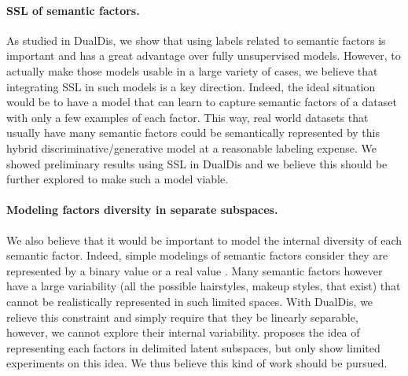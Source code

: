 \paragraph{\acf{SSL} of semantic factors.}
As studied in DualDis, we show that using labels related to semantic factors is important and has a great advantage over fully unsupervised models. However, to actually make those models usable in a large variety of cases, we believe that integrating \ac{SSL} in such models is a key direction. Indeed, the ideal situation would be to have a model that can learn to capture semantic factors of a dataset with only a few examples of each factor. This way, real world datasets that usually have many semantic factors could be semantically represented by this hybrid discriminative/generative model at a reasonable labeling expense. We showed preliminary results using \ac{SSL} in DualDis and we believe this should be further explored to make such a model viable.

\paragraph{Modeling factors diversity in separate subspaces.}
We also believe that it would be important to model the internal diversity of each semantic factor. Indeed, simple modelings of semantic factors consider they are represented by a binary value \citep[\eg\unskip][]{perarnau2016invertible} or a real value \citep[\eg\unskip][]{Lample2017}. 
Many semantic factors however have a large variability (\eg all the possible hairstyles, makeup styles, \etc that exist) that cannot be realistically represented in such limited spaces. With DualDis, we relieve this constraint and simply require that they be linearly separable, however, we cannot explore their internal variability. \citet{Klys2018} proposes the idea of representing each factors in delimited latent subspaces, but only show limited experiments on this idea. We thus believe this kind of work should be pursued.

